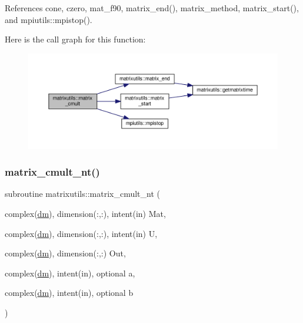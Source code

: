 References cone, czero, mat\+\_\+f90, matrix\+\_\+end(), matrix\+\_\+method, matrix\+\_\+start(), and mpiutils\+::mpistop().

Here is the call graph for this function\+:
\nopagebreak
\begin{figure}[H]
\begin{center}
\leavevmode
\includegraphics[width=350pt]{namespacematrixutils_a623ed13db8bf49d73e233e3668d3923c_cgraph}
\end{center}
\end{figure}
\mbox{\label{namespacematrixutils_afdb73dd3fe4ce57e9ba27e6d3d511376}} 
\subsubsection{\texorpdfstring{matrix\+\_\+cmult\+\_\+nt()}{matrix\_cmult\_nt()}}
{\footnotesize\ttfamily subroutine matrixutils\+::matrix\+\_\+cmult\+\_\+nt (\begin{DoxyParamCaption}\item[{complex(\mbox{\hyperlink{namespacematrixutils_a7bdc564986ea4d90f51201c75606ef3d}{dm}}), dimension(\+:,\+:), intent(in)}]{Mat,  }\item[{complex(\mbox{\hyperlink{namespacematrixutils_a7bdc564986ea4d90f51201c75606ef3d}{dm}}), dimension(\+:,\+:), intent(in)}]{U,  }\item[{complex(\mbox{\hyperlink{namespacematrixutils_a7bdc564986ea4d90f51201c75606ef3d}{dm}}), dimension(\+:,\+:)}]{Out,  }\item[{complex(\mbox{\hyperlink{namespacematrixutils_a7bdc564986ea4d90f51201c75606ef3d}{dm}}), intent(in), optional}]{a,  }\item[{complex(\mbox{\hyperlink{namespacematrixutils_a7bdc564986ea4d90f51201c75606ef3d}{dm}}), intent(in), optional}]{b }\end{DoxyParamCaption})}



